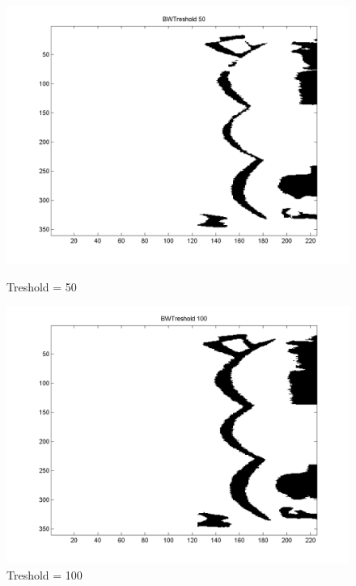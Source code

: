 \documentclass[a4paper]{article}
\begin{document}
\begin{figure}[h!]
  \begin{minipage}[b]{0.5\linewidth}
    \centering
    \includegraphics[width=\linewidth]{img/BWTreshold_50.png}
    \caption{Treshold = 50}
    \label{fig:bw50}
  \end{minipage}
  \hspace{0.5cm}
  \begin{minipage}[b]{0.5\linewidth}
    \centering
    \includegraphics[width=\linewidth]{img/BWTreshold_100.png}
    \caption{Treshold = 100}
    \label{fig:bw100}
  \end{minipage}
\end{figure}
\end{document}
